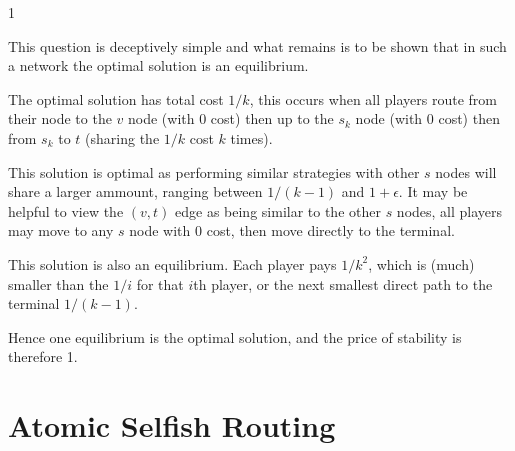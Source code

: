 \documentclass{article}
\begin{document}
1

This question is deceptively simple and what remains is to be shown that in such a network the optimal solution is an equilibrium.

The optimal solution has total cost $1/k$, this occurs when all players route from their node to the $v$ node (with 0 cost) then up to the $s_k$ node (with 0 cost) then from $s_k$ to $t$ (sharing the $1/k$ cost $k$ times).

This solution is optimal as performing similar strategies with other $s$ nodes will share a larger ammount, ranging between $1/(k-1)$ and $1+\epsilon$.
It may be helpful to view the $(v,t)$ edge as being similar to the other $s$ nodes, all players may move to any $s$ node with 0 cost, then move directly to the terminal.

This solution is also an equilibrium.
Each player pays $1/{k^2}$, which is (much) smaller than the $1/i$ for that $i$th player, or the next smallest direct path to the terminal $1/(k-1)$.

Hence one equilibrium is the optimal solution, and the price of stability is therefore 1.

\section {Atomic Selfish Routing}
\end{document}
